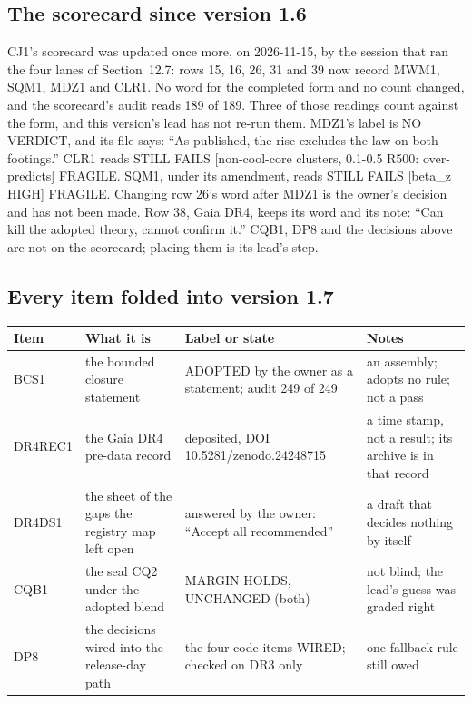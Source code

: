 \documentclass[10pt]{article}
\begin{document}
\subsection{The scorecard since version 1.6}
CJ1's scorecard was updated once more, on 2026-11-15, by the session that ran the four lanes of Section~12.7: rows 15, 16, 26, 31 and 39 now record MWM1, SQM1, MDZ1 and CLR1. No word for the completed form and no count changed, and the scorecard's audit reads 189 of 189. Three of those readings count against the form, and this version's lead has not re-run them. MDZ1's label is NO VERDICT, and its file says: ``As published, the rise excludes the law on both footings.'' CLR1 reads STILL FAILS [non-cool-core clusters, 0.1-0.5 R500: over-predicts] FRAGILE. SQM1, under its amendment, reads STILL FAILS [beta\_z HIGH] FRAGILE. Changing row 26's word after MDZ1 is the owner's decision and has not been made. Row 38, Gaia DR4, keeps its word and its note: ``Can kill the adopted theory, cannot confirm it.'' CQB1, DP8 and the decisions above are not on the scorecard; placing them is its lead's step.

\subsection{Every item folded into version 1.7}
{\footnotesize
\begin{longtable}{@{}p{2.2cm}p{5.2cm}p{4.6cm}p{3.7cm}@{}}\toprule
Item & What it is & Label or state & Notes\\\midrule\endhead
BCS1 & the bounded closure statement & ADOPTED by the owner as a statement; audit 249 of 249 & an assembly; adopts no rule; not a pass\\
DR4REC1 & the Gaia DR4 pre-data record & deposited, DOI 10.5281/zenodo.24248715 & a time stamp, not a result; its archive is in that record\\
DR4DS1 & the sheet of the gaps the registry map left open & answered by the owner: ``Accept all recommended'' & a draft that decides nothing by itself\\
CQB1 & the seal CQ2 under the adopted blend & MARGIN HOLDS, UNCHANGED (both) & not blind; the lead's guess was graded right\\
DP8 & the decisions wired into the release-day path & the four code items WIRED; checked on DR3 only & one fallback rule still owed\\\bottomrule
\end{longtable}}
\end{document}
